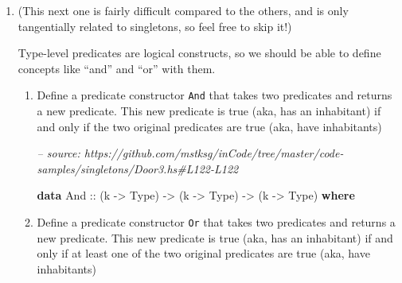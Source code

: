 \documentclass[]{article}
\newenvironment{Shaded}{}{}
\newcommand{\CommentTok}[1]{\textcolor[rgb]{0.38,0.63,0.69}{\textit{#1}}}
\newcommand{\DataTypeTok}[1]{\textcolor[rgb]{0.56,0.13,0.00}{#1}}
\newcommand{\FunctionTok}[1]{\textcolor[rgb]{0.02,0.16,0.49}{#1}}
\newcommand{\KeywordTok}[1]{\textcolor[rgb]{0.00,0.44,0.13}{\textbf{#1}}}
\newcommand{\NormalTok}[1]{#1}
\newcommand{\OtherTok}[1]{\textcolor[rgb]{0.00,0.44,0.13}{#1}}
\renewcommand{\href}[2]{#2\footnote{\url{#1}}}
\begin{document}
\begin{enumerate}
  While not required, I recommend using \texttt{isKnockable} and writing your
  implementation in terms of it! Use \texttt{sing} to give \texttt{isKnockable}
  the singleton it needs.

  Solution available
  \href{https://github.com/mstksg/inCode/tree/master/code-samples/singletons/Door3.hs\#L112-L119}{here}!

  \emph{Hint:} You might find \texttt{absurd} (from \emph{Data.Void}) helpful:

\begin{Shaded}
\begin{Highlighting}[]
\OtherTok{absurd ::}\NormalTok{ forall a}\FunctionTok{.} \DataTypeTok{Void} \OtherTok{->}\NormalTok{ a}
\end{Highlighting}
\end{Shaded}

  If you have a \texttt{Void}, you can make a value of any type!\footnote{It's
    the good ol'
    \href{https://en.wikipedia.org/wiki/Principle_of_explosion}{Principle of
    Explosion}}
\item
  (This next one is fairly difficult compared to the others, and is only
  tangentially related to singletons, so feel free to skip it!)

  Type-level predicates are logical constructs, so we should be able to define
  concepts like ``and'' and ``or'' with them.

  \begin{enumerate}
  \def\labelenumii{\alph{enumii}.}
  \item
    Define a predicate constructor \texttt{And} that takes two predicates and
    returns a new predicate. This new predicate is true (aka, has an inhabitant)
    if and only if the two original predicates are true (aka, have inhabitants)

\begin{Shaded}
\begin{Highlighting}[]
\CommentTok{-- source: https://github.com/mstksg/inCode/tree/master/code-samples/singletons/Door3.hs#L122-L122}

\KeywordTok{data} \DataTypeTok{And}\OtherTok{ ::}\NormalTok{ (k }\OtherTok{->} \DataTypeTok{Type}\NormalTok{) }\OtherTok{->}\NormalTok{ (k }\OtherTok{->} \DataTypeTok{Type}\NormalTok{) }\OtherTok{->}\NormalTok{ (k }\OtherTok{->} \DataTypeTok{Type}\NormalTok{) }\KeywordTok{where}
\end{Highlighting}
\end{Shaded}
  \item
    Define a predicate constructor \texttt{Or} that takes two predicates and
    returns a new predicate. This new predicate is true (aka, has an inhabitant)
    if and only if at least one of the two original predicates are true (aka,
    have inhabitants)


\end{enumerate}
\end{enumerate}
\end{document}
